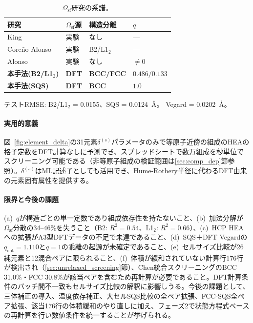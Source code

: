 \documentclass[5p,10pt]{elsarticle}
\begin{document}
\begin{table}[H]
\centering
\caption{$\Omega_\text{sf}$研究の系譜。}
\label{tab:method_comparison}
\scriptsize
\begin{tabular}{@{}llll@{}}
\toprule
研究 & $\Omega_\text{sf}$源 & 構造分離 & $q$ \\
\midrule
King~\cite{King1966} & 実験 & なし & --- \\
Coreño-Alonso~\cite{CorenoAlonso2004} & 実験 & B2/L1$_2$ & --- \\
Alonso~\cite{Alonso2021} & 実験 & なし & $\neq 0$ \\
\midrule
\textbf{本手法(B2/L1$_2$)} & \textbf{DFT} & \textbf{BCC/FCC} & $0.486/0.133$ \\
\textbf{本手法(SQS)} & \textbf{DFT} & \textbf{BCC} & $\mathbf{1.0}$ \\
\bottomrule
\end{tabular}
\par\smallskip
{\scriptsize
テストRMSE: B2/L1$_2$ = 0.0155、SQS = 0.0124~\AA{}。
Vegard = 0.0202~\AA{}。}
\end{table}

\paragraph{実用的意義}
図~\ref{fig:element_delta}の31元素$\delta^{(s)}$パラメータのみで等原子近傍の組成のHEAの格子定数をDFT計算なしに予測でき、スプレッドシートで数万組成を秒単位でスクリーニング可能である（非等原子組成の検証範囲は\ref{sec:comp_dep}節参照）。$\delta^{(s)}$はML記述子としても活用でき、Hume-Rothery半径に代わるDFT由来の元素固有属性を提供する。

\paragraph{限界と今後の課題}
(a)~$q$が構造ごとの単一定数であり組成依存性を持たないこと、(b)~加法分解が$\Omega_\text{sf}$分散の34--46\%を失うこと（B2: $R^2 = 0.54$、L1$_2$: $R^2 = 0.66$）、(c)~HCP HEAへの拡張がA3型DFTデータの不足で未達であること、(d)~SQS＋DFT Vegardの$q_\text{opt} = 1.110$と$q = 1$の乖離の起源が未確定であること、(e)~セルサイズ比較が26純元素と12混合ペアに限られること、(f)~体積が緩和されていない計算行176行が検出され（\ref{sec:unrelaxed_screening}節）、Chen統合スクリーニングのBCC 31.0\%・FCC 30.8\%が該当ペアを含むため再計算が必要であること。DFT計算条件のバッチ間不一致もセルサイズ比較の解釈に影響しうる。今後の課題として、三体補正の導入、温度依存補正、大セルSQS比較の全ペア拡張、FCC-SQS全ペア拡張、該当176行の体積緩和のやり直しに加え、フェーズ2で状態方程式ベースの再計算を行い数値条件を統一することが挙げられる。
\end{document}
